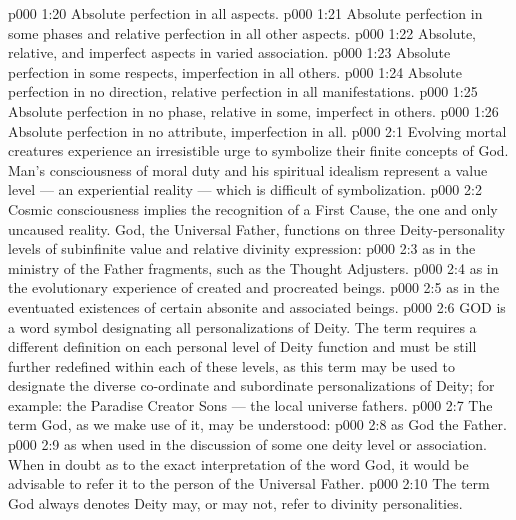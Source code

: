 \vs p000 1:20 \bibnobreakspace Absolute perfection in all aspects.
\vs p000 1:21 \bibnobreakspace Absolute perfection in some phases and relative perfection in all other aspects.
\vs p000 1:22 \bibnobreakspace Absolute, relative, and imperfect aspects in varied association.
\vs p000 1:23 \bibnobreakspace Absolute perfection in some respects, imperfection in all others.
\vs p000 1:24 \bibnobreakspace Absolute perfection in no direction, relative perfection in all manifestations.
\vs p000 1:25 \bibnobreakspace Absolute perfection in no phase, relative in some, imperfect in others.
\vs p000 1:26 \bibnobreakspace Absolute perfection in no attribute, imperfection in all.
\vs p000 2:1 Evolving mortal creatures experience an irresistible urge to symbolize their finite concepts of God. Man’s consciousness of moral duty and his spiritual idealism represent a value level --- an experiential reality --- which is difficult of symbolization.
\vs p000 2:2 Cosmic consciousness implies the recognition of a First Cause, the one and only uncaused reality. God, the Universal Father, functions on three Deity\hyp{}personality levels of subinfinite value and relative divinity expression:
\vs p000 2:3 \bibnobreakspace {} as in the ministry of the Father fragments, such as the Thought Adjusters.
\vs p000 2:4 \bibnobreakspace {} as in the evolutionary experience of created and procreated beings.
\vs p000 2:5 \bibnobreakspace {} as in the eventuated existences of certain absonite and associated beings.
\vs p000 2:6 GOD is a word symbol designating all personalizations of Deity. The term requires a different definition on each personal level of Deity function and must be still further redefined within each of these levels, as this term may be used to designate the diverse co\hyp{}ordinate and subordinate personalizations of Deity; for example: the Paradise Creator Sons --- the local universe fathers.
\vs p000 2:7 \pc The term God, as we make use of it, may be understood:
\vs p000 2:8  as God the Father.
\vs p000 2:9  as when used in the discussion of some one deity level or association. When in doubt as to the exact interpretation of the word God, it would be advisable to refer it to the person of the Universal Father.
\vs p000 2:10 \pc The term God always denotes  Deity may, or may not, refer to divinity personalities.
